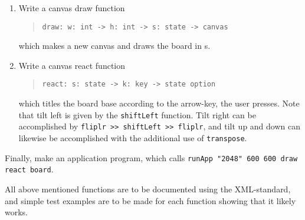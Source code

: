 \begin{enumerate}
\item Write a canvas draw function
  \begin{quote}
    \lstinline{draw: w: int -> h: int -> s: state -> canvas}
  \end{quote}
  which makes a new canvas and draws the board in s.
\item Write a canvas react function
  \begin{quote}
    \lstinline{react: s: state -> k: key -> state option}
  \end{quote}
  which titles the board base according to the arrow-key, the user presses. Note that tilt left is given by the \lstinline{shiftLeft} function. Tilt right can be accomplished by \lstinline{fliplr >> shiftLeft >> fliplr}, and tilt up and down can likewise be accomplished with the additional use of \lstinline{transpose}.
\end{enumerate}
Finally, make an application program, which calls \lstinline{runApp "2048" 600 600 draw react board}.

All above mentioned functions are to be documented using the XML-standard, and simple test examples are to be made for each function showing that it likely works.
